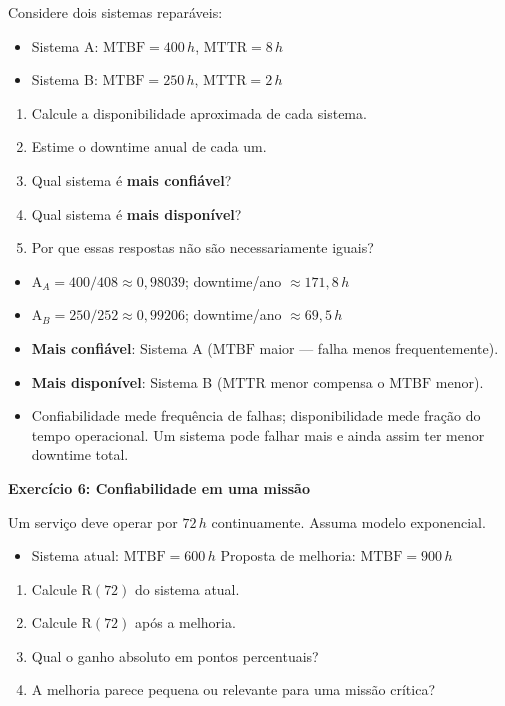 \documentclass[10pt,a4paper]{article}
\newcommand{\R}{\mathrm{R}}
\newcommand{\A}{\mathrm{A}}
\newcommand{\MTBF}{\mathrm{MTBF}}
\newcommand{\MTTR}{\mathrm{MTTR}}
\begin{document}
Considere dois sistemas reparáveis:
\begin{itemize}
  \item Sistema A: \(\MTBF=400\,h\), \(\MTTR=8\,h\)
  \item Sistema B: \(\MTBF=250\,h\), \(\MTTR=2\,h\)
\end{itemize}
\begin{enumerate}
  \item Calcule a disponibilidade aproximada de cada sistema.
  \item Estime o downtime anual de cada um.
  \item Qual sistema é \textbf{mais confiável}?
  \item Qual sistema é \textbf{mais disponível}?
  \item Por que essas respostas não são necessariamente iguais?
\end{enumerate}

\begin{solucao}
\begin{itemize}
  \item \(\A_A = 400/408 \approx 0{,}98039\); downtime/ano \(\approx 171{,}8\,h\)
  \item \(\A_B = 250/252 \approx 0{,}99206\); downtime/ano \(\approx 69{,}5\,h\)
  \item \textbf{Mais confiável}: Sistema A (\(\MTBF\) maior — falha menos frequentemente).
  \item \textbf{Mais disponível}: Sistema B (\(\MTTR\) menor compensa o \(\MTBF\) menor).
  \item Confiabilidade mede frequência de falhas; disponibilidade mede fração do tempo operacional. Um sistema pode falhar mais e ainda assim ter menor downtime total.
\end{itemize}
\end{solucao}

\vspace{4pt}

\textbf{Exercício 6: Confiabilidade em uma missão}

Um serviço deve operar por \(72\,h\) continuamente. Assuma modelo exponencial.
\begin{itemize}
  \item Sistema atual: \(\MTBF=600\,h\) \quad Proposta de melhoria: \(\MTBF=900\,h\)
\end{itemize}
\begin{enumerate}
  \item Calcule \(\R(72)\) do sistema atual.
  \item Calcule \(\R(72)\) após a melhoria.
  \item Qual o ganho absoluto em pontos percentuais?
  \item A melhoria parece pequena ou relevante para uma missão crítica?
\end{enumerate}
\end{document}
